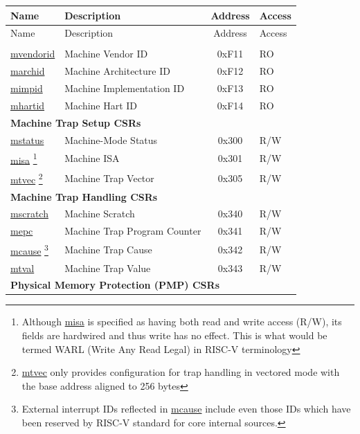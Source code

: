 
\begin{longtable}{ | p{4.0cm} | p{8.4cm} | c | l | }
\hline\rowcolor{lightgray}
Name & Description & Address & Access \\ \hline
\endfirsthead
\hline
\rowcolor{lightgray}
Name & Description & Address & Access \\
\hline
\endhead
\endfoot

\multicolumn{4}{|l|}{\textbf{Machine Information CSRs}} \\\hline
\hyperref[regdesc:MVENDORID]{mvendorid} & Machine Vendor ID & 0xF11 & RO \\\hline
\hyperref[regdesc:MARCHID]{marchid} & Machine Architecture ID & 0xF12 & RO \\\hline
\hyperref[regdesc:MIMPID]{mimpid} & Machine Implementation ID & 0xF13 & RO \\\hline
\hyperref[regdesc:MHARTID]{mhartid} & Machine Hart ID & 0xF14 & RO \\\hline
\multicolumn{4}{|l|}{\textbf{Machine Trap Setup CSRs}} \\\hline
\hyperref[regdesc:MSTATUS]{mstatus} & Machine-Mode Status & 0x300 & R/W \\\hline
\hyperref[regdesc:MISA]{misa} \footnote{Although \hyperref[regdesc:MISA]{misa} is specified as having both read and write access (R/W), its fields are hardwired and thus write has no effect. This is what would be termed WARL (Write Any Read Legal) in RISC-V terminology} & Machine ISA & 0x301 & R/W \\\hline
\hyperref[regdesc:MTVEC]{mtvec} \footnote{\hyperref[regdesc:MTVEC]{mtvec} only provides configuration for trap handling in vectored mode with the base address aligned to 256 bytes} & Machine Trap Vector & 0x305 & R/W \\\hline
\multicolumn{4}{|l|}{\textbf{Machine Trap Handling CSRs}} \\\hline
\hyperref[regdesc:MSCRATCH]{mscratch} & Machine Scratch & 0x340 & R/W \\\hline
\hyperref[regdesc:MEPC]{mepc} & Machine Trap Program Counter & 0x341 & R/W \\\hline
\hyperref[regdesc:MCAUSE]{mcause} \footnote{External interrupt IDs reflected in \hyperref[regdesc:MCAUSE]{mcause} include even those IDs which have been reserved by RISC-V standard for core internal sources.} & Machine Trap Cause & 0x342 & R/W \\\hline
\hyperref[regdesc:MTVAL]{mtval} & Machine Trap Value & 0x343 & R/W \\\hline
\multicolumn{4}{|l|}{\textbf{Physical Memory Protection (PMP) CSRs}} \\\hline

\end{longtable}
